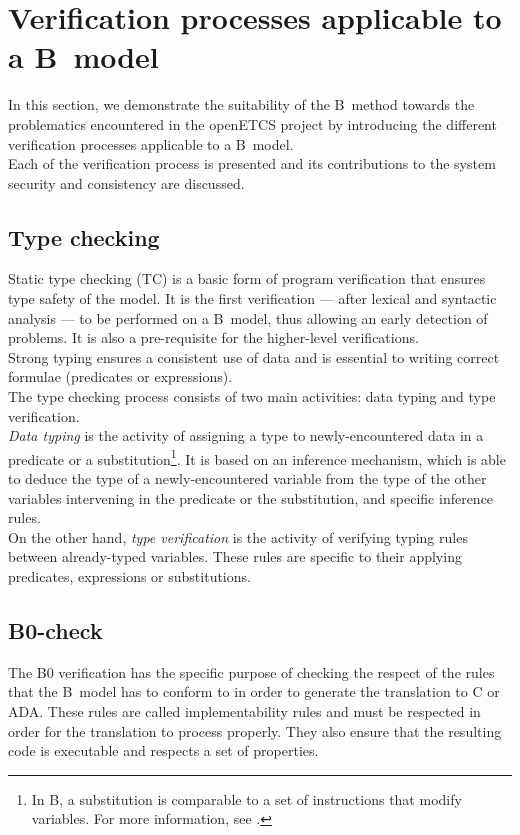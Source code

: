 \documentclass{article}
\begin{document}
\section{Verification processes applicable to a B~model}
\label{sec:processes}
In this section, we demonstrate the suitability of the B~method towards the problematics encountered in the openETCS project by introducing the different verification processes applicable to a B~model.\\
Each of the verification process is presented and its contributions to the system security and consistency are discussed.

\subsection{Type checking}
Static type checking (TC) is a basic form of program verification that ensures type safety of the model. It is the first verification --- after lexical and syntactic analysis --- to be performed on a B~model, thus allowing an early detection of problems. It is also a pre-requisite for the higher-level verifications. \\
Strong typing ensures a consistent use of data and is essential to writing correct formulae (predicates or expressions).\\

The type checking process consists of two main activities: data typing and type verification.\\
{\itshape Data typing} is the activity of assigning a type to newly-encountered data in a predicate or a substitution\footnote{In B, a substitution is comparable to a set of instructions that modify variables. For more information, see \cite{bbook}.}. It is based on an inference mechanism, which is able to deduce the type of a newly-encountered variable from the type of the other variables intervening in the predicate or the substitution, and specific inference rules.\\
On the other hand, {\itshape type verification} is the activity of verifying typing rules between already-typed variables. These rules are specific to their applying predicates, expressions or substitutions.

\subsection{B0-check}
The B0 verification has the specific purpose of checking the respect of the rules that the B~model has to conform to in order to generate the translation to C or ADA. These rules are called implementability rules and must be respected in order for the translation to process properly. They also ensure that the resulting code is executable and respects a set of properties.
\end{document}
